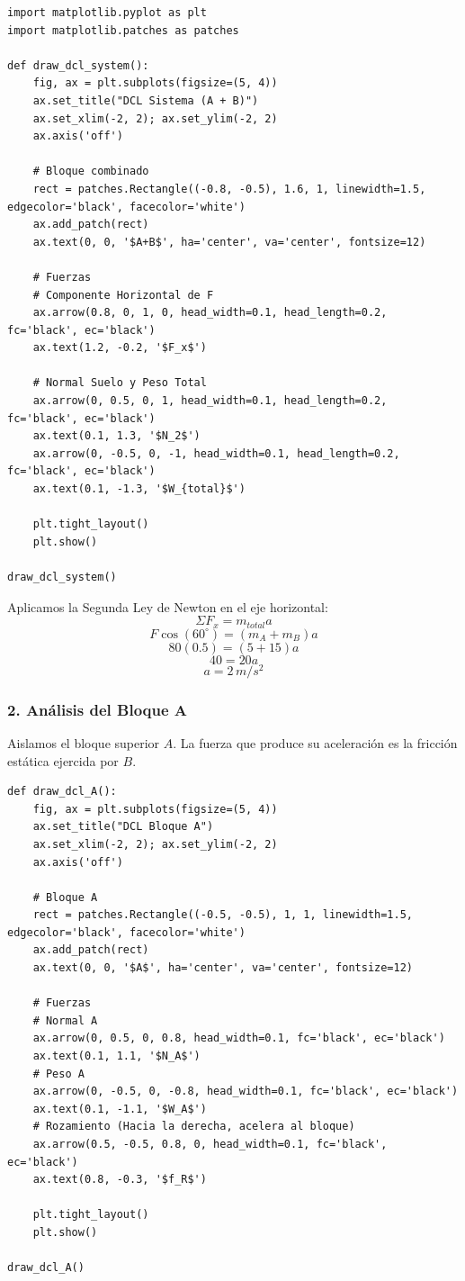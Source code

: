 \documentclass[12pt, a4paper]{article}
\begin{document}
\begin{lstlisting}
import matplotlib.pyplot as plt
import matplotlib.patches as patches

def draw_dcl_system():
    fig, ax = plt.subplots(figsize=(5, 4))
    ax.set_title("DCL Sistema (A + B)")
    ax.set_xlim(-2, 2); ax.set_ylim(-2, 2)
    ax.axis('off')
    
    # Bloque combinado
    rect = patches.Rectangle((-0.8, -0.5), 1.6, 1, linewidth=1.5, edgecolor='black', facecolor='white')
    ax.add_patch(rect)
    ax.text(0, 0, '$A+B$', ha='center', va='center', fontsize=12)
    
    # Fuerzas
    # Componente Horizontal de F
    ax.arrow(0.8, 0, 1, 0, head_width=0.1, head_length=0.2, fc='black', ec='black')
    ax.text(1.2, -0.2, '$F_x$')
    
    # Normal Suelo y Peso Total
    ax.arrow(0, 0.5, 0, 1, head_width=0.1, head_length=0.2, fc='black', ec='black')
    ax.text(0.1, 1.3, '$N_2$')
    ax.arrow(0, -0.5, 0, -1, head_width=0.1, head_length=0.2, fc='black', ec='black')
    ax.text(0.1, -1.3, '$W_{total}$')

    plt.tight_layout()
    plt.show()

draw_dcl_system()
\end{lstlisting}

Aplicamos la Segunda Ley de Newton en el eje horizontal:
$$ \Sigma F_x = m_{total} a $$
$$ F \cos(60^\circ) = (m_A + m_B) a $$
$$ 80 (0.5) = (5 + 15) a $$
$$ 40 = 20 a $$
$$ \boxed{a = 2 \, \si{m/s^2}} $$

\subsubsection*{2. Análisis del Bloque A}
Aislamos el bloque superior $A$. La fuerza que produce su aceleración es la fricción estática ejercida por $B$.

\begin{lstlisting}
def draw_dcl_A():
    fig, ax = plt.subplots(figsize=(5, 4))
    ax.set_title("DCL Bloque A")
    ax.set_xlim(-2, 2); ax.set_ylim(-2, 2)
    ax.axis('off')
    
    # Bloque A
    rect = patches.Rectangle((-0.5, -0.5), 1, 1, linewidth=1.5, edgecolor='black', facecolor='white')
    ax.add_patch(rect)
    ax.text(0, 0, '$A$', ha='center', va='center', fontsize=12)
    
    # Fuerzas
    # Normal A
    ax.arrow(0, 0.5, 0, 0.8, head_width=0.1, fc='black', ec='black')
    ax.text(0.1, 1.1, '$N_A$')
    # Peso A
    ax.arrow(0, -0.5, 0, -0.8, head_width=0.1, fc='black', ec='black')
    ax.text(0.1, -1.1, '$W_A$')
    # Rozamiento (Hacia la derecha, acelera al bloque)
    ax.arrow(0.5, -0.5, 0.8, 0, head_width=0.1, fc='black', ec='black')
    ax.text(0.8, -0.3, '$f_R$')

    plt.tight_layout()
    plt.show()

draw_dcl_A()
\end{lstlisting}
\end{document}
